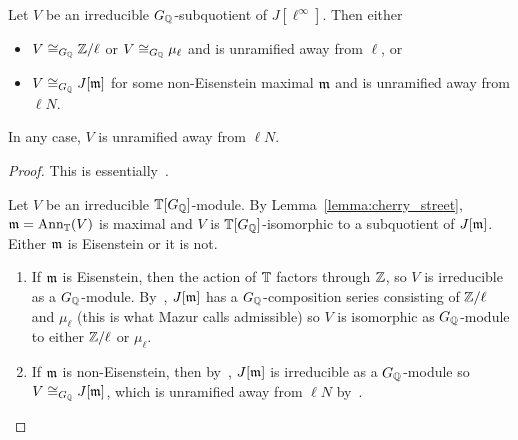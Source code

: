 \documentclass{article}
\begin{document}
\begin{theorem}[Mazur]\label{thm:irreducible_G_sub}
    Let $V$ be an irreducible $G_{\mathbb{Q}}$-subquotient of $J[\ell^\infty]$. Then either
    \begin{itemize}
        \item
            $V\cong_{G_{\mathbb{Q}}} \mathbb{Z}/\ell$ or $V\cong_{G_{\mathbb{Q}}} \mu_\ell$ and is unramified away
            from $\ell$, or
        \item 
            $V\cong_{G_{\mathbb{Q}}} J[\mathfrak{m}]$ for some non-Eisenstein maximal $\mathfrak{m}$ and is
            unramified away from $\ell N$.
    \end{itemize}
    In any case, $V$ is unramified away from $\ell N$.
\end{theorem}
\begin{proof}
    This is essentially~\cite[\S 14]{mazur:eisenstein}.

    Let $V$ be an irreducible $\mathbb{T}[G_{\mathbb{Q}}]$-module. By Lemma~\ref{lemma:cherry_street},
    $\mathfrak{m}=\operatorname{Ann}_{\mathbb{T}}(V)$ is maximal and $V$ is $\mathbb{T}[G_{\mathbb{Q}}]$-isomorphic to a subquotient of
    $J[\mathfrak{m}]$. Either $\mathfrak{m}$ is Eisenstein or it is not.
    \begin{enumerate}
        \item
            If $\mathfrak{m}$ is Eisenstein, then the action of $\mathbb{T}$ factors through
            $\mathbb{Z}$, so $V$ is irreducible as a $G_{\mathbb{Q}}$-module. By~\cite[Proposition
            14.1]{mazur:eisenstein}, $J[\mathfrak{m}]$ has a $G_{\mathbb{Q}}$-composition series
            consisting of $\mathbb{Z}/\ell$ and $\mu_\ell$ (this is what Mazur calls
            admissible) so $V$ is isomorphic as $G_{\mathbb{Q}}$-module to either $\mathbb{Z}/\ell$
            or $\mu_\ell$.
        \item
            If $\mathfrak{m}$ is non-Eisenstein, then by~\cite[Proposition
            14.2]{mazur:eisenstein}, $J[\mathfrak{m}]$ is irreducible as a $G_{\mathbb{Q}}$-module
            so $V\cong_{G_{\mathbb{Q}}} J[\mathfrak{m}]$, which is unramified away from $\ell N$
            by~\cite[Theorem 6.7]{deligne-serre}.
    \end{enumerate}
\end{proof} 
\end{document}
